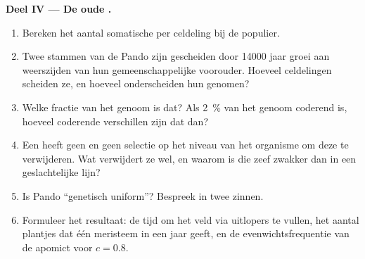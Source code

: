 \begin{problem}
\medskip
\noindent\textbf{Deel IV --- De oude .}
\begin{enumerate}[resume]
  \item Bereken het aantal somatische  per celdeling bij de
        populier.
  \item Twee stammen van de  Pando zijn gescheiden door \num{14000}
        jaar groei aan weerszijden van hun gemeenschappelijke voorouder.
        Hoeveel celdelingen scheiden ze, en hoeveel  onderscheiden
        hun genomen?
  \item Welke fractie van het genoom is dat? Als \qty{2}{\%} van het
        genoom coderend is, hoeveel coderende verschillen zijn dat dan?
  \item Een  heeft geen  en geen selectie op het niveau van het
        organisme om deze  te verwijderen. Wat verwijdert ze wel,
        en waarom is die zeef zwakker dan in een geslachtelijke lijn?
  \item Is Pando ``genetisch uniform''? Bespreek in twee zinnen.
  \item Formuleer het resultaat: de tijd om het veld via uitlopers te
        vullen, het aantal plantjes dat één meristeem in een jaar geeft, en
        de evenwichtsfrequentie van de apomict voor $c = 0.8$.
\end{enumerate}
\end{problem}
